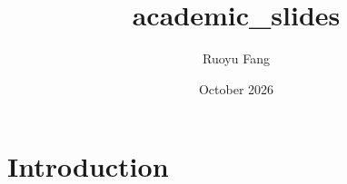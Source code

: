 \documentclass{article}
\title{academic_slides}
\author{Ruoyu Fang}
\date{October 2026}
\begin{document}
\maketitle

\section{Introduction}
\end{document}
